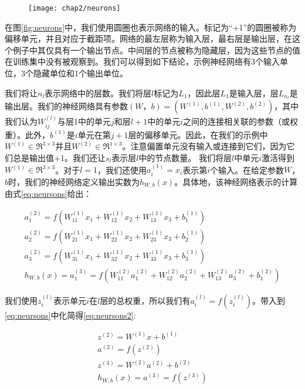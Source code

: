 \begin{figure}[!htp]
    \centering
    \texttt{[image: chap2/neurons]}
\end{figure}
在图\ref{fig:neurons}中，我们使用圆圈也表示网络的输入。标记为“+1”的圆圈被称为偏移单元，并且对应于截距项。网络的最左层称为输入层，最右层是输出层，在这个例子中其仅具有一个输出节点。中间层的节点被称为隐藏层，因为这些节点的值在训练集中没有被观察到。我们可以得到如下结论，示例神经网络有3个输入单位，3个隐藏单位和1个输出单位。

我们将让$n_l$表示网络中的层数。我们将层$l$标记为$L_1$，因此层$L_1$是输入层，层$L_{n_{l}}$是输出层。我们的神经网络具有参数$(W，b)=(W^{(1)},b^{(1)},W^{(2)},b^{(2)})$，其中我们认为$W ^ {(l)} _ {ij}$与层1中的单元$j$和层$l + 1$中的单元$i$之间的连接相关联的参数（或权重）。此外，$b ^ {(1)}$是$i$单元在第$j+1$层的偏移单元。因此，在我们的示例中$W^{(1)} \in \Re^{3\times 3}$并且$ W^{(2)} \in \Re^{1\times 3}$。注意偏置单元没有输入或连接到它们，因为它们总是输出值+1。我们还让$s_l$表示层$l$中的节点数量。
我们将层$l$中单元$i$激活得到$ W^{(1)} \in \Re^{3\times 3} $。对于$l = 1$，我们还使用$a^{(1)}_i = x_i$表示第$i$个输入。在给定参数$W$，$b$时，我们的神经网络定义输出实数为$h_{W,b}(x)$。具体地，该神经网络表示的计算由式\ref{eq:neursons}给出：

{\setlength\abovedisplayskip{15pt}
\setlength\belowdisplayskip{15pt}
\begin{eqnarray}
    \label{eq:neursons}
    a_1^{(2)} = f(W_{11}^{(1)}x_1 + W_{12}^{(1)} x_2 + W_{13}^{(1)} x_3 + b_1^{(1)})  \nonumber \\
    a_2^{(2)} = f(W_{21}^{(1)}x_1 + W_{22}^{(1)} x_2 + W_{23}^{(1)} x_3 + b_2^{(1)})  \nonumber \\
    a_3^{(2)} = f(W_{31}^{(1)}x_1 + W_{32}^{(1)} x_2 + W_{33}^{(1)} x_3 + b_3^{(1)})  \\
    h_{W,b}(x) = a_1^{(3)} =  f(W_{11}^{(2)}a_1^{(2)} + W_{12}^{(2)} a_2^{(2)} + W_{13}^{(2)} a_3^{(2)} + b_1^{(2)}) \nonumber
\end{eqnarray}}

我们使用$z^{(l)}_i $表示单元$i$在$l$层的总权重，所以我们有$a^{(l)}_i = f(z^{(l)}_i)$。带入到\ref{eq:neursons}中化简得\ref{eq:neursons2}:

{\setlength\abovedisplayskip{15pt}
\setlength\belowdisplayskip{15pt}
\begin{eqnarray}
    \label{eq:neursons2}
    z^{(2)} = W^{(1)} x + b^{(1)}  \nonumber \\
    a^{(2)} = f(z^{(2)})  \nonumber \\
    z^{(3)} = W^{(2)} a^{(2)} + b^{(2)}  \\
    h_{W,b}(x) = a^{(3)} = f(z^{(3)})  \nonumber
\end{eqnarray}}

